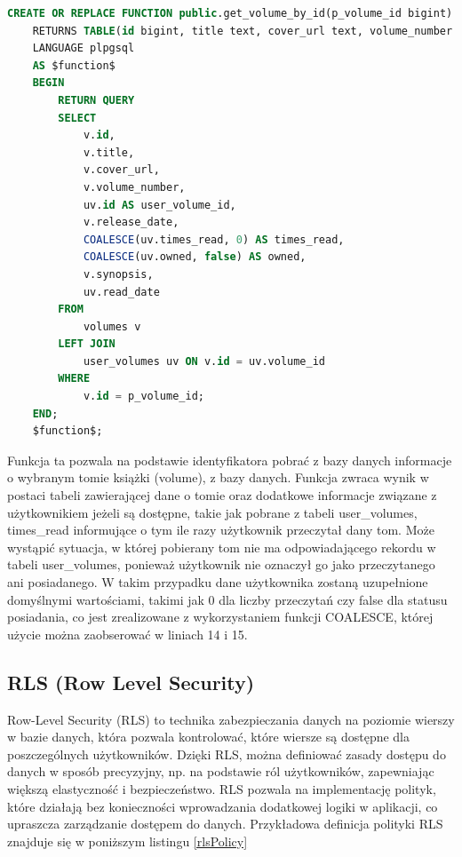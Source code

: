 \documentclass[12pt,twoside]{article}
\begin{document}
\begin{lstlisting}[language=SQL,caption=kod funkcji get\_volume\_by\_id, label={sqlFunction}]
	CREATE OR REPLACE FUNCTION public.get_volume_by_id(p_volume_id bigint)
	RETURNS TABLE(id bigint, title text, cover_url text, volume_number smallint, user_volume_id bigint, release_date timestamp with time zone, times_read smallint, owned boolean, synopsis text, read_date timestamp with time zone)
	LANGUAGE plpgsql
	AS $function$
	BEGIN
		RETURN QUERY
		SELECT 
			v.id,
			v.title,
			v.cover_url,
			v.volume_number,
			uv.id AS user_volume_id,
			v.release_date,
			COALESCE(uv.times_read, 0) AS times_read,
			COALESCE(uv.owned, false) AS owned,
			v.synopsis,
			uv.read_date
		FROM 
			volumes v
		LEFT JOIN 
			user_volumes uv ON v.id = uv.volume_id
		WHERE 
			v.id = p_volume_id;
	END;
	$function$;
\end{lstlisting}
Funkcja ta pozwala na podstawie identyfikatora pobrać z bazy danych informacje o wybranym tomie książki (volume), z bazy
danych. Funkcja zwraca wynik w postaci tabeli zawierającej dane o tomie oraz dodatkowe informacje związane z użytkownikiem
jeżeli są dostępne, takie jak pobrane z tabeli user\_volumes, times\_read informujące o tym ile razy użytkownik przeczytał
dany tom. Może wystąpić sytuacja, w której pobierany tom nie ma odpowiadającego rekordu w tabeli user\_volumes, ponieważ 
użytkownik nie oznaczył go jako przeczytanego ani posiadanego. W takim przypadku dane użytkownika zostaną uzupełnione 
domyślnymi wartościami, takimi jak 0 dla liczby przeczytań czy false dla statusu posiadania, co jest zrealizowane z 
wykorzystaniem funkcji COALESCE, której użycie można zaobserować w liniach 14 i 15.

\subsection{RLS (Row Level Security)}

Row-Level Security (RLS) to technika zabezpieczania danych na poziomie wierszy w bazie danych, która pozwala 
kontrolować, które wiersze są dostępne dla poszczególnych użytkowników. Dzięki RLS, można definiować zasady 
dostępu do danych w sposób precyzyjny, np. na podstawie ról użytkowników, zapewniając większą elastyczność i 
bezpieczeństwo. RLS pozwala na implementację polityk, które działają bez konieczności wprowadzania dodatkowej 
logiki w aplikacji, co upraszcza zarządzanie dostępem do danych. Przykładowa definicja polityki RLS znajduje się
w poniższym listingu \ref{rlsPolicy}
\end{document}
